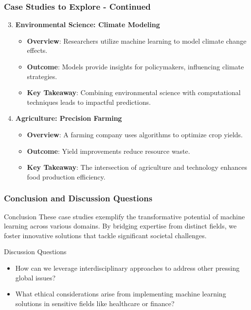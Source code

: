 \documentclass[aspectratio=169]{beamer}
\begin{document}
\begin{frame}[fragile]
    \frametitle{Case Studies to Explore - Continued}
    \begin{enumerate}
        \setcounter{enumi}{2} %
        \item \textbf{Environmental Science: Climate Modeling} \\
            \begin{itemize}
                \item \textbf{Overview}: Researchers utilize machine learning to model climate change effects.
                \item \textbf{Outcome}: Models provide insights for policymakers, influencing climate strategies.
                \item \textbf{Key Takeaway}: Combining environmental science with computational techniques leads to impactful predictions.
            \end{itemize}
        
        \item \textbf{Agriculture: Precision Farming} \\
            \begin{itemize}
                \item \textbf{Overview}: A farming company uses algorithms to optimize crop yields.
                \item \textbf{Outcome}: Yield improvements reduce resource waste.
                \item \textbf{Key Takeaway}: The intersection of agriculture and technology enhances food production efficiency.
            \end{itemize}
    \end{enumerate}
\end{frame}

\begin{frame}[fragile]
    \frametitle{Conclusion and Discussion Questions}
    \begin{block}{Conclusion}
        These case studies exemplify the transformative potential of machine learning across various domains. By bridging expertise from distinct fields, we foster innovative solutions that tackle significant societal challenges.
    \end{block}
    
    \begin{block}{Discussion Questions}
        \begin{itemize}
            \item How can we leverage interdisciplinary approaches to address other pressing global issues?
            \item What ethical considerations arise from implementing machine learning solutions in sensitive fields like healthcare or finance?
        \end{itemize}
    \end{block}
\end{frame}
\end{document}
